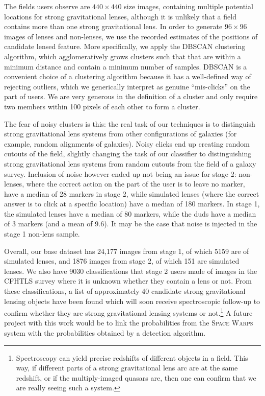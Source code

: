 \documentclass[10pt,twocolumn,letterpaper]{article}
\begin{document}
The fields users observe are $440\times440$ size images, containing multiple
potential locations for strong gravitational lenses, although it is unlikely
that a field contains more than one strong gravitational lens. In order to
generate $96\times96$ images of lenses and non-lenses, we use the recorded
estimates of the positions of candidate lensed feature. More specifically, we
apply the \textsc{DBSCAN} clustering algorithm, which agglomeratively grows
clusters such that that are within a minimum distance and contain a minimum
number of samples. \textsc{DBSCAN} is a convenient choice of a clustering
algorithm because it has a well-defined way of rejecting outliers, which we
generically interpret as genuine ``mis-clicks'' on the part of users. We are
very generous in the definition of a cluster and only require two members within
100 pixels of each other to form a cluster. 

The fear of noisy clusters is this: the real task of our techniques is to
distinguish strong gravitational lens systems from other configurations of
galaxies (for example, random alignments of galaxies). Noisy clicks end up
creating random cutouts of the field, slightly changing the task of our
classifier to distinguishing strong gravitational lens systems from random
cutouts from the field of a galaxy survey.  Inclusion of noise however ended up
not being an issue for stage 2: non-lenses, where the correct action on the
part of the user is to leave no marker, have a median of 28 markers in stage 2,
while simulated lenses (where the correct answer is to click at a specific
location) have a median of 180 markers. In stage 1, the simulated lenses have a
median of 80 markers, while the duds have a median of 3 markers (and a mean of
9.6). It may be the case that noise is injected in the stage 1 non-lens sample.

Overall, our base dataset has 24,177 images from stage 1, of which 5159 are of
simulated lenses, and 1876 images from stage 2, of which 151 are simulated
lenses. We also have 9030 classifications that stage 2 users made of images in
the CFHTLS survey where it is unknown whether they contain a lens or not. From
these classifications, a list of approximately 40 candidate strong
gravitational lensing objects have been found which will soon receive
spectroscopic follow-up to confirm whether they are strong gravitational
lensing systems or not.\footnote{Spectroscopy can yield precise redshifts of
  different objects in a field. This way, if different parts of a strong
  gravitational lens arc are at the same redshift, or if the multiply-imaged
quasars are, then one can confirm that we are really seeing such a system.} A
future project with this work would be to link the probabilities from the
\textsc{Space Warps} system with the probabilities obtained by a detection
algorithm.
\end{document}
